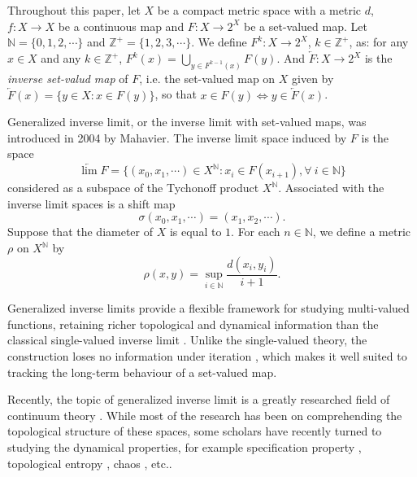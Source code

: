 \documentclass[12pt]{amsart}
\theoremstyle{definition}
\begin{document}
Throughout this paper, let $X$ be a compact metric space with a metric $d$, $f:X\rightarrow X$ be a continuous map and $F:X\rightarrow 2^X$ be a set-valued map. Let $\mathbb{N}=\{0,1,2,\cdots\}$ and $\mathbb{Z^+}=\{1,2,3,\cdots\}$. We define $F^k:X\rightarrow 2^X$, $k\in\mathbb{Z}^+$, as: for any $x\in X$ and any $k\in\mathbb{Z}^+$, $F^k(x)=\bigcup_{y\in F^{k-1}(x)}F(y)$. And $\underleftarrow{F}:X\rightarrow 2^X$ is the \emph{inverse set-valud map} of $F$, i.e. the set-valued map on $X$ given by $\underleftarrow{F}(x)=\{y\in X:x\in F(y)\}$, so that $x\in F(y)\Leftrightarrow y\in\underleftarrow{F}(x)$. %

Generalized inverse limit, or the inverse limit with set-valued maps, was introduced in 2004 by Mahavier\cite{Mahavier2004}. The inverse limit space induced by $F$ is the space $$\underleftarrow{\lim} F=\{(x_0, x_1,\cdots)\in X^{\mathbb{N}}: x_{i}\in F(x_{i+1}), \forall~i\in\mathbb{N}\}$$ considered as a subspace of the Tychonoff product $X^{\mathbb{N}}$. Associated with the inverse limit spaces is a shift map $$\sigma(x_0,x_1,\cdots)=(x_1,x_2,\cdots).$$Suppose that the diameter of $X$ is equal to $1$. For each $n\in\mathbb{N}$, we define a metric $\rho$ on $X^{\mathbb{N}}$ by $$\rho(x,y)=\sup_{i\in\mathbb{N}}\frac{d(x_i,y_i)}{i+1}.$$


Generalized inverse limits provide a flexible framework for studying multi-valued functions, retaining richer topological and dynamical information than the classical single-valued inverse limit \cite{Banic2020,Aubin}. Unlike the single-valued theory, the construction loses no information under iteration \cite{Erceg2018}, which makes it well suited to tracking the long-term behaviour of a set-valued map.

Recently, the topic of generalized inverse limit is a greatly researched field of continuum theory \cite{Charatonik2021,Davies2021}. While most of the research has been on comprehending the topological structure of these spaces, some scholars have recently turned to studying the dynamical properties, for example specification property \cite{Raines2018}, topological entropy \cite{Erceg2018}, chaos \cite{zhao2023}, etc..
\end{document}
